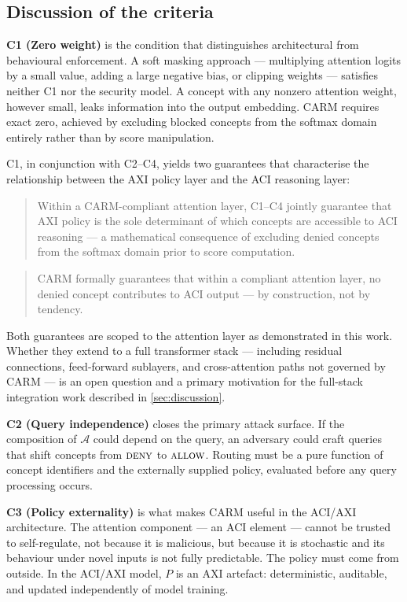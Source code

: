 \documentclass[11pt,a4paper]{article}
\theoremstyle{definition}
\newcommand{\ALLOW}{\mbox{\textsc{allow}}}
\newcommand{\DENY}{\mbox{\textsc{deny}}}
\newcommand{\acc}{\mathcal{A}}
\newcommand{\policy}{P}
\begin{document}
\subsection{Discussion of the criteria}
\label{sec:criteria}

\textbf{C1 (Zero weight)} is the condition that distinguishes architectural from
behavioural enforcement. A soft masking approach --- multiplying attention logits by
a small value, adding a large negative bias, or clipping weights --- satisfies
neither C1 nor the security model. A concept with any nonzero attention weight,
however small, leaks information into the output embedding. CARM requires exact
zero, achieved by excluding blocked concepts from the softmax domain entirely rather
than by score manipulation.

C1, in conjunction with C2--C4, yields two guarantees that characterise the
relationship between the AXI policy layer and the ACI reasoning layer:

\begin{quote}
Within a CARM-compliant attention layer, C1--C4 jointly guarantee that AXI policy
is the sole determinant of which concepts are accessible to ACI reasoning --- a
mathematical consequence of excluding denied concepts from the softmax domain prior
to score computation.
\end{quote}

\begin{quote}
CARM formally guarantees that within a compliant attention layer, no denied concept
contributes to ACI output --- by construction, not by tendency.
\end{quote}

Both guarantees are scoped to the attention layer as demonstrated in this work.
Whether they extend to a full transformer stack --- including residual connections,
feed-forward sublayers, and cross-attention paths not governed by CARM --- is an
open question and a primary motivation for the full-stack integration work described
in \cref{sec:discussion}.

\textbf{C2 (Query independence)} closes the primary attack surface. If the
composition of $\acc$ could depend on the query, an adversary could craft queries
that shift concepts from $\DENY$ to $\ALLOW$. Routing must be a pure function of
concept identifiers and the externally supplied policy, evaluated before any query
processing occurs.

\textbf{C3 (Policy externality)} is what makes CARM useful in the ACI/AXI
architecture. The attention component --- an ACI element --- cannot be trusted to
self-regulate, not because it is malicious, but because it is stochastic and its
behaviour under novel inputs is not fully predictable. The policy must come from
outside. In the ACI/AXI model, $\policy$ is an AXI artefact: deterministic,
auditable, and updated independently of model training.
\end{document}
